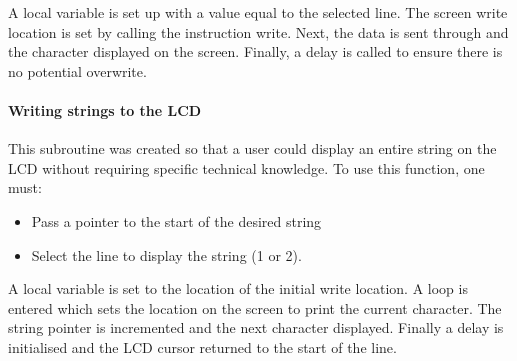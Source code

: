 \documentclass[]{report}
\begin{document}
A local variable is set up with a value equal to the selected line. The screen write location is set by calling the instruction write. Next, the data is sent through and the character displayed on the screen. Finally, a delay is called to ensure there is no potential overwrite.

\paragraph{Writing strings to the LCD}
This subroutine was created so that a user could display an entire string on the LCD without requiring specific technical knowledge. To use this function, one must:
\begin{itemize}
\item Pass a pointer to the start of the desired string
\item Select the line to display the string (1 or 2).
\end{itemize}

A local variable is set to the location of the initial write location. A loop is entered which sets the location on the screen to print the current character. The string pointer is incremented and the next character displayed. Finally a delay is initialised and the LCD cursor returned to the start of the line.
\end{document}
